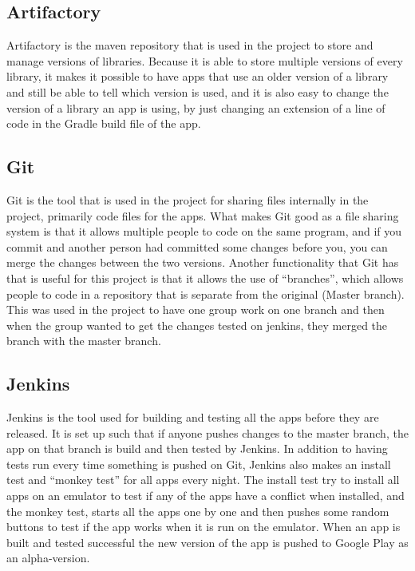 \subsection{Artifactory}
Artifactory is the maven repository that is used in the project to store and manage versions of libraries. Because it is able to store multiple versions of every library, it makes it possible to have apps that use an older version of a library and still be able to tell which version is used, and it is also easy to change the version of a library an app is using, by just changing an extension of a line of code in the Gradle build file of the app.

\subsection{Git}
Git is the tool that is used in the project for sharing files internally in the project, primarily code files for the apps. What makes Git good as a file sharing system is that it allows multiple people to code on the same program, and if you commit and another person had committed some changes before you, you can merge the changes between the two versions. Another functionality that Git has that is useful for this project is that it allows the use of “branches”, which allows people to code in a repository that is separate from the original (Master branch). This was used in the project to have one group work on one branch and then when the group wanted to get the changes tested on jenkins, they merged the branch with the master branch.

\subsection{Jenkins}
Jenkins is the tool used for building and testing all the apps before they are released. It is set up such that if anyone pushes changes to the master branch, the app on that branch is build and then tested by Jenkins. In addition to having tests run every time something is pushed on Git, Jenkins also makes an install test and “monkey test” for all apps every night. The install test try to install all apps on an emulator to test if any of the apps have a conflict when installed, and the monkey test, starts all the apps one by one and then pushes some random buttons to test if the app works when it is run on the emulator. When an app is built and tested successful the new version of the app is pushed to Google Play as an alpha-version.

